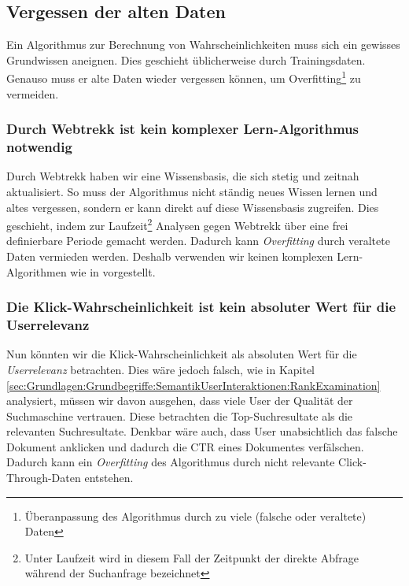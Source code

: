 \subsection{Vergessen der alten Daten}
\label{sec:Reranking:Methodik:Vergessen}

Ein Algorithmus zur Berechnung von Wahrscheinlichkeiten muss sich ein gewisses Grundwissen aneignen. Dies geschieht üblicherweise durch Trainingsdaten. Genauso muss er alte Daten wieder vergessen können, um Overfitting\footnote{Überanpassung des Algorithmus durch zu viele (falsche oder veraltete) Daten} zu vermeiden. 

\subsubsection{Durch Webtrekk ist kein komplexer Lern-Algorithmus notwendig}
\label{sec:Reranking:Methodik:Vergessen:Lern-Algorithmus}

Durch Webtrekk haben wir eine Wissensbasis, die sich stetig und zeitnah aktualisiert. So muss der Algorithmus nicht ständig neues Wissen lernen und altes vergessen, sondern er kann direkt auf diese Wissensbasis zugreifen. Dies geschieht, indem zur Laufzeit\footnote{Unter Laufzeit wird in diesem Fall der Zeitpunkt der direkte Abfrage während der Suchanfrage bezeichnet} Analysen gegen Webtrekk über eine frei definierbare Periode gemacht werden. Dadurch kann \textit{Overfitting} durch veraltete Daten vermieden werden. Deshalb verwenden wir keinen komplexen Lern-Algorithmen wie in \cite{IWUSBI} vorgestellt.

\subsubsection{Die Klick-Wahrscheinlichkeit ist kein absoluter Wert für die Userrelevanz}
\label{sec:Reranking:Methodik:Vergessen:Relevanzfeedback}

Nun könnten wir die Klick-Wahrscheinlichkeit als absoluten Wert für die \textit{Userrelevanz} betrachten. Dies wäre jedoch falsch, wie in Kapitel \ref{sec:Grundlagen:Grundbegriffe:SemantikUserInteraktionen:RankExamination} analysiert, müssen wir davon ausgehen, dass viele User der Qualität der Suchmaschine vertrauen. Diese betrachten die \glqq Top-Suchresultate\grqq{} als die relevanten Suchresultate. Denkbar wäre auch, dass User unabsichtlich das falsche Dokument anklicken und dadurch die CTR eines Dokumentes verfälschen. Dadurch kann ein \textit{Overfitting} des Algorithmus durch nicht relevante Click-Through-Daten entstehen.

